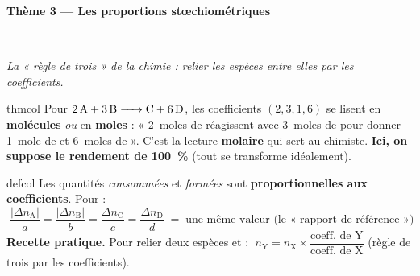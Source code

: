 \documentclass[11pt,a4paper]{article}
\newcommand{\nq}[1]{n_{\text{#1}}}
\begin{document}
\begin{center}
{\LARGE\bfseries\color{primarydark}Thème 3 — Les proportions stœchiométriques}\\[1pt]
{\color{primary}\rule{0.5\linewidth}{1.2pt}}\\[2pt]
{\itshape La « règle de trois » de la chimie : relier les espèces entre elles par les coefficients.}
\end{center}
\vspace{-3pt}

\begin{tutobox}{thmcol}
Pour $\ce{2 A + 3 B -> C + 6 D}$, les coefficients $(2,3,1,6)$ se lisent en \textbf{molécules}
\emph{ou} en \textbf{moles} : « 2~moles de  réagissent avec 3~moles de  pour donner
1~mole de  et 6~moles de  ». C'est la lecture \textbf{molaire} qui sert au chimiste.
\textbf{Ici, on suppose le rendement de \SI{100}{\percent}} (tout se transforme idéalement).
\end{tutobox}

\begin{tutobox}{defcol}
Les quantités \emph{consommées} et \emph{formées} sont \textbf{proportionnelles aux coefficients}.
Pour  :
\[
\boxed{\;\dfrac{|\Delta \nq{A}|}{a}=\dfrac{|\Delta \nq{B}|}{b}=\dfrac{\Delta \nq{C}}{c}=\dfrac{\Delta \nq{D}}{d}\;=\;\text{une même valeur (le « rapport de référence »)}}
\]
\textbf{Recette pratique.} Pour relier deux espèces  et  :
$\;\boxed{\nq{Y}=\nq{X}\times\dfrac{\text{coeff.\ de Y}}{\text{coeff.\ de X}}}$ (règle de trois par les coefficients).
\end{tutobox}
\end{document}
